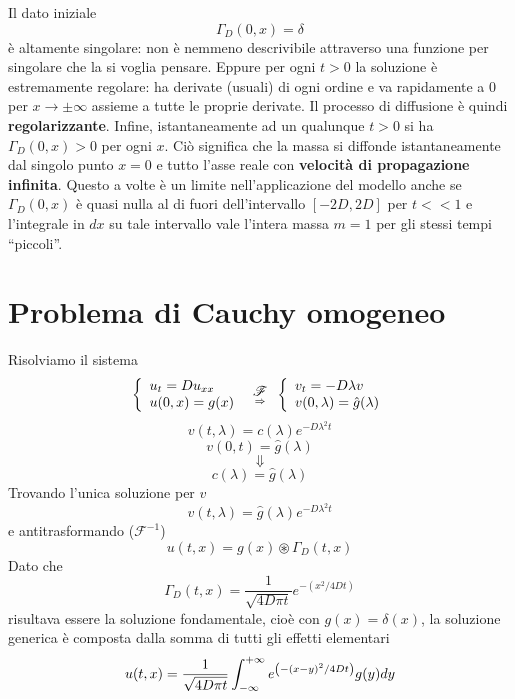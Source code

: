 Il dato iniziale 
\[
	\Gamma_D(0,x)= \delta
\]
\`e altamente singolare: non \`e nemmeno descrivibile attraverso una funzione
per singolare che la si voglia pensare.
Eppure per ogni $t>0$ la soluzione \`e estremamente regolare: ha derivate (usuali)
di ogni ordine e va rapidamente a $0$ per $x \to \pm \infty$ assieme a tutte
le proprie derivate.
Il processo di diffusione \`e quindi {\bf regolarizzante}.
Infine, istantaneamente ad un qualunque $t>0$ si ha $\Gamma_D(0,x)>0$ per ogni
$x$. Ci\`o significa che la massa si diffonde istantaneamente dal singolo punto
$x=0$ e tutto l'asse reale con {\bf velocit\`a di propagazione infinita}.
Questo a volte \`e un limite nell'applicazione del modello anche se $\Gamma_D(0,x)$
\`e quasi nulla al di fuori dell'intervallo $[-2D, 2D]$ per $t<<1$ e
l'integrale in $dx$ su tale intervallo vale l'intera massa $m=1$ per gli
stessi tempi ``piccoli''.
\section{Problema di Cauchy omogeneo}
Risolviamo il sistema
\[
	\left\{
	\begin{array}{l}
		u_t= Du_{xx}\\
		u(0,x)= g(x)
	\end{array}
	\right. 
	\substack{\displaystyle{\mathscr{F}} \\ \;\;\; \Rightarrow \;\;\;}
	\left\{
	\begin{array}{l}
		v_t= -D\lambda v\\
		v(0,\lambda)= \hat{g}(\lambda)
	\end{array}
	\right. 
\]
\[
	v(t, \lambda)= c(\lambda)e^{-D\lambda^2t}
\]
\[
	v(0,t)= \hat{g}(\lambda)
\]
\[
	\Downarrow
\]
\[
	c(\lambda)= \hat{g}(\lambda)
\]
Trovando l'unica soluzione per $v$
\[
	v(t,\lambda)= \hat{g}(\lambda)e^{-D\lambda^2t}
\]
e antitrasformando ($\mathscr{F}^{-1}$)
\[
	u(t,x)= g(x) \circledast \Gamma_D(t,x)
\]
Dato che 
\[
	\Gamma_D(t,x)=
	\frac{1}{\sqrt{4D\pi t}}
	e^{-\left( x^2/4Dt \right)}
\]
risultava essere la soluzione fondamentale, cio\`e con $g(x)=\delta(x)$,
la soluzione generica \`e composta dalla somma di tutti gli effetti elementari
\[
	u(t,x)= \frac{1}{\sqrt{4D\pi t}} \int_{- \infty}^{+ \infty} 
	e^{\left( -(x-y)^2 / 4Dt \right)}
	g(y) dy
\]
